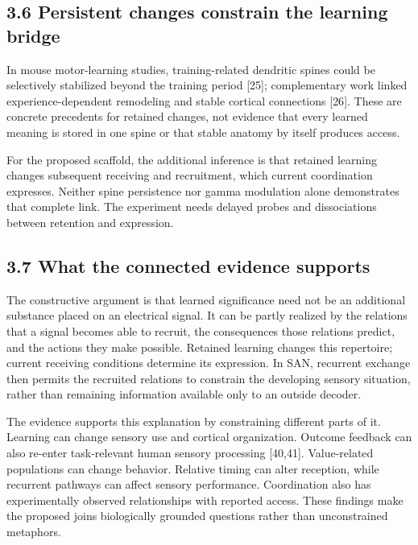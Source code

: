 \documentclass[
  american,
  11pt,
  letterpaper,
]{article}
\begin{document}
\subsection{3.6 Persistent changes constrain the learning bridge}\label{persistent-changes-constrain-the-learning-bridge}

In mouse motor-learning studies, training-related dendritic spines could be selectively stabilized beyond the training period {[}25{]}; complementary work linked experience-dependent remodeling and stable cortical connections {[}26{]}. These are concrete precedents for retained changes, not evidence that every learned meaning is stored in one spine or that stable anatomy by itself produces access.

For the proposed scaffold, the additional inference is that retained learning changes subsequent receiving and recruitment, which current coordination expresses. Neither spine persistence nor gamma modulation alone demonstrates that complete link. The experiment needs delayed probes and dissociations between retention and expression.

\subsection{3.7 What the connected evidence supports}\label{what-the-connected-evidence-supports}

The constructive argument is that learned significance need not be an additional substance placed on an electrical signal. It can be partly realized by the relations that a signal becomes able to recruit, the consequences those relations predict, and the actions they make possible. Retained learning changes this repertoire; current receiving conditions determine its expression. In SAN, recurrent exchange then permits the recruited relations to constrain the developing sensory situation, rather than remaining information available only to an outside decoder.

The evidence supports this explanation by constraining different parts of it. Learning can change sensory use and cortical organization. Outcome feedback can also re-enter task-relevant human sensory processing {[}40,41{]}. Value-related populations can change behavior. Relative timing can alter reception, while recurrent pathways can affect sensory performance. Coordination also has experimentally observed relationships with reported access. These findings make the proposed joins biologically grounded questions rather than unconstrained metaphors.
\end{document}
